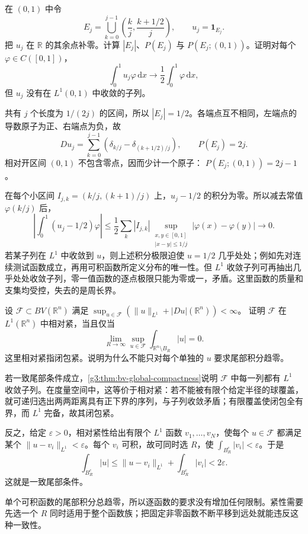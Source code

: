 \begin{exercise}\label{g3:ex:bv-checkerboard-noncompactness}
	在 \((0,1)\) 中令
	\[
		E_j=\bigcup_{k=0}^{j-1}
		\left(\frac{k}{j},\frac{k+1/2}{j}\right),\qquad u_j=\mathbf1_{E_j}.
	\]
	把 \(u_j\) 在 \(\mathbb R\) 的其余点补零。计算 \(|E_j|\)、\(P(E_j)\) 与 \(P(E_j;(0,1))\)。证明对每个 \(\varphi\in C([0,1])\)，
	\[
		\int_0^1u_j\varphi\,\mathrm dx\longrightarrow
		\frac12\int_0^1\varphi\,\mathrm dx,
	\]
	但 \(u_j\) 没有在 \(L^1(0,1)\) 中收敛的子列。
\end{exercise}
\begin{solution}
	共有 \(j\) 个长度为 \(1/(2j)\) 的区间，所以 \(|E_j|=1/2\)。各端点互不相同，左端点的导数原子为正、右端点为负，故
	\[
		Du_j=\sum_{k=0}^{j-1}
		\left(\delta_{k/j}-\delta_{(k+1/2)/j}\right),\qquad P(E_j)=2j.
	\]
	相对开区间 \((0,1)\) 不包含零点，因而少计一个原子：
	\(P(E_j;(0,1))=2j-1\)。

	在每个小区间 \(I_{j,k}=(k/j,(k+1)/j)\) 上，\(u_j-1/2\) 的积分为零。所以减去常值 \(\varphi(k/j)\) 后，
	\[
		\left|\int_0^1(u_j-1/2)\varphi\right|
		\le \frac12\sum_k|I_{j,k}|
		\sup_{\substack{x,y\in[0,1]\\|x-y|\le1/j}}
		|\varphi(x)-\varphi(y)|\longrightarrow0.
	\]
	若某子列在 \(L^1\) 中收敛到 \(u\)，则上述积分极限迫使 \(u=1/2\) 几乎处处；例如先对连续测试函数成立，再用可积函数所定义分布的唯一性。但 \(L^1\) 收敛子列可再抽出几乎处处收敛子列，零一值函数的逐点极限只能为零或一，矛盾。这里函数的质量和支集均受控，失去的是周长界。
\end{solution}

\begin{exercise}\label{g3:ex:bv-tightness-characterization}
	设 \(\mathcal F\subset BV(\mathbb R^n)\) 满足
	\(\sup_{u\in\mathcal F}(\|u\|_{L^1}+|Du|(\mathbb R^n))<\infty\)。
	证明 \(\mathcal F\) 在 \(L^1(\mathbb R^n)\) 中相对紧，当且仅当
	\[
		\lim_{R\to\infty}\sup_{u\in\mathcal F}
		\int_{\mathbb R^n\setminus B_R}|u|=0.
	\]
	这里相对紧指闭包紧。说明为什么不能只对每个单独的 \(u\) 要求尾部积分趋零。
\end{exercise}
\begin{solution}
	若一致尾部条件成立，\cref{g3:thm:bv-global-compactness}说明 \(\mathcal F\) 中每一列都有 \(L^1\) 收敛子列。在度量空间中，这等价于相对紧：若不能被有限个给定半径的球覆盖，就可递归选出两两距离具有正下界的序列，与子列收敛矛盾；有限覆盖使闭包全有界，而 \(L^1\) 完备，故其闭包紧。

	反之，给定 \(\varepsilon>0\)，相对紧性给出有限个 \(L^1\) 函数 \(v_1,\ldots,v_N\)，使每个 \(u\in\mathcal F\) 都满足某个
	\(\|u-v_i\|_{L^1}<\varepsilon\)。每个 \(v_i\) 可积，故可同时选 \(R\)，使
	\(\int_{B_R^c}|v_i|<\varepsilon\)。于是
	\[
		\int_{B_R^c}|u|
		\le\|u-v_i\|_{L^1}+\int_{B_R^c}|v_i|<2\varepsilon.
	\]
	这就是一致尾部条件。

	单个可积函数的尾部积分总趋零，所以逐函数的要求没有增加任何限制。紧性需要先选一个 \(R\) 同时适用于整个函数族；把固定非零函数不断平移到远处就能违反这种一致性。
\end{solution}

